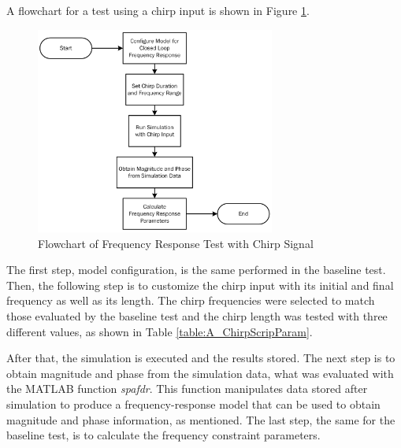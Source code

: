 A flowchart for a test using a chirp input is shown in Figure \ref{fig:a4_3_2_1_ChirpFrequencyResponseFlowchart}.

\begin{figure}[H]
	\centering
	\centerline{\includegraphics[width=0.7\textwidth]{Figuras/4.DynamicStifinessOptimizationAlgorithm/4-3-2-1-ChirpFrequencyResponse.jpg}}
	\caption{Flowchart of Frequency Response Test with Chirp Signal}
	\label{fig:a4_3_2_1_ChirpFrequencyResponseFlowchart}
\end{figure}

The first step, model configuration, is the same performed in the baseline test. Then, the following step is to customize the chirp input with its initial and final frequency as well as its length. The chirp frequencies were selected to match those evaluated by the baseline test and the chirp length was tested with three different values, as shown in Table \ref{table:A_ChirpScripParam}. 

\begin{table}[H]
	\label{table:A_ChirpScripParam}
	\centering
\end{table}

After that, the simulation is executed and the results stored. The next step is to obtain magnitude and phase from the simulation data, what was evaluated with the MATLAB function \textit{spafdr}. This function manipulates data stored after simulation to produce a frequency-response model that can be used to obtain magnitude and phase information, as mentioned. The last step, the same for the baseline test, is to calculate the frequency constraint parameters.

